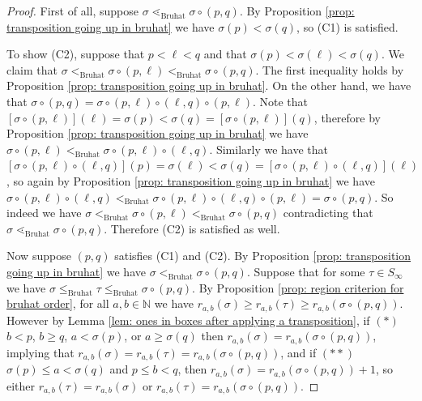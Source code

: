 \documentclass[oneside,11pt,reqno]{amsart}
\newcommand{\nn}{\ensuremath{\mathbb{N}}}
\theoremstyle{definition}
\newtheorem{proof techniques}{Proof Techniques}
\begin{document}
\begin{proof}
First of all, suppose $\sigma \lessdot_\text{Bruhat} \sigma \circ (p , q)$. By Proposition \ref{prop: transposition going up in bruhat} we have $\sigma(p) < \sigma(q)$, so (C1) is satisfied. 

To show (C2), suppose that $p < \ell < q$ and that $\sigma(p) < \sigma(\ell) < \sigma(q)$. We claim that $\sigma <_\text{Bruhat} \sigma \circ (p , \ell) <_\text{Bruhat} \sigma \circ (p , q)$. The first inequality holds by Proposition \ref{prop: transposition going up in bruhat}. On the other hand, we have that $\sigma \circ (p , q) = \sigma \circ (p , \ell) \circ (\ell , q) \circ (p , \ell)$. Note that $[\sigma \circ (p , \ell)](\ell) = \sigma(p) < \sigma(q) = [\sigma \circ (p , \ell)](q)$, therefore by Proposition \ref{prop: transposition going up in bruhat} we have $\sigma \circ (p , \ell) <_\text{Bruhat} \sigma \circ (p , \ell) \circ (\ell , q)$. Similarly we have that $[\sigma \circ (p , \ell) \circ (\ell , q)](p) = \sigma(\ell) < \sigma(q) = [\sigma \circ (p , \ell) \circ (\ell , q)](\ell)$, so again by Proposition \ref{prop: transposition going up in bruhat} we have $\sigma \circ (p , \ell) \circ (\ell , q) <_\text{Bruhat} \sigma \circ (p , \ell) \circ (\ell , q) \circ (p , \ell) = \sigma \circ (p , q)$. So indeed we have $\sigma <_\text{Bruhat} \sigma \circ (p , \ell) <_\text{Bruhat} \sigma \circ (p , q)$ contradicting that $\sigma \lessdot_\text{Bruhat} \sigma \circ (p , q)$. Therefore (C2) is satisfied as well.

Now suppose $(p , q)$ satisfies (C1) and (C2). By Proposition \ref{prop: transposition going up in bruhat} we have $\sigma <_\text{Bruhat} \sigma \circ (p , q)$. Suppose that for some $\tau \in S_\infty$ we have $\sigma \leq_\text{Bruhat} \tau \leq_\text{Bruhat} \sigma \circ (p , q)$. By Proposition \ref{prop: region criterion for bruhat order}, for all $a , b \in \nn$ we have $r_{a , b}(\sigma) \geq r_{a , b}(\tau) \geq r_{a , b}(\sigma \circ (p , q))$. However by Lemma \ref{lem: ones in boxes after applying a transposition}, if $(\ast)$ $b < p$, $b \geq q$, $a < \sigma(p)$, or $a \geq \sigma(q)$ then $r_{a , b}(\sigma) = r_{ a , b}(\sigma \circ (p , q))$, implying that $r_{a , b}(\sigma) = r_{a , b}(\tau) = r_{ a , b}(\sigma \circ (p , q))$, and if $(\ast \ast)$ $\sigma(p) \leq a < \sigma(q)$ and $p \leq b < q$, then $r_{a , b}(\sigma) = r_{a , b}(\sigma \circ (p , q)) + 1$, so either $r_{a , b}(\tau) = r_{a , b}(\sigma)$ or $r_{a , b}(\tau) = r_{ a , b}(\sigma \circ (p , q))$.


\end{proof}
\end{document}
